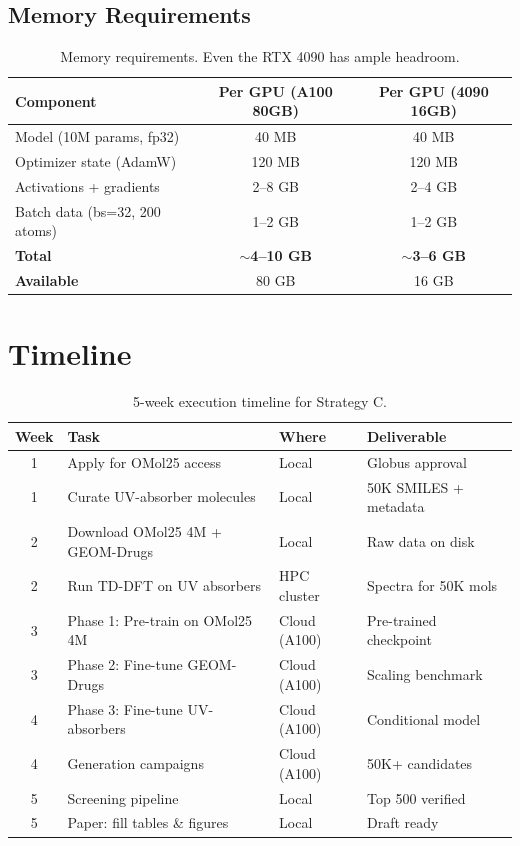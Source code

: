 \documentclass[11pt,a4paper]{article}
\begin{document}
\subsection{Memory Requirements}

\begin{table}[h]
\centering
\begin{tabular}{@{}lcc@{}}
\toprule
\textbf{Component} & \textbf{Per GPU (A100 80GB)} & \textbf{Per GPU (4090 16GB)} \\
\midrule
Model (10M params, fp32) & 40 MB & 40 MB \\
Optimizer state (AdamW) & 120 MB & 120 MB \\
Activations + gradients & 2--8 GB & 2--4 GB \\
Batch data (bs=32, 200 atoms) & 1--2 GB & 1--2 GB \\
\textbf{Total} & \textbf{$\sim$4--10 GB} & \textbf{$\sim$3--6 GB} \\
\textbf{Available} & 80 GB & 16 GB \\
\bottomrule
\end{tabular}
\caption{Memory requirements. Even the RTX 4090 has ample headroom.}
\end{table}

\section{Timeline}

\begin{table}[h]
\centering
\begin{tabular}{@{}clll@{}}
\toprule
\textbf{Week} & \textbf{Task} & \textbf{Where} & \textbf{Deliverable} \\
\midrule
1 & Apply for OMol25 access & Local & Globus approval \\
1 & Curate UV-absorber molecules & Local & 50K SMILES + metadata \\
2 & Download OMol25 4M + GEOM-Drugs & Local & Raw data on disk \\
2 & Run TD-DFT on UV absorbers & HPC cluster & Spectra for 50K mols \\
3 & Phase 1: Pre-train on OMol25 4M & Cloud (A100) & Pre-trained checkpoint \\
3 & Phase 2: Fine-tune GEOM-Drugs & Cloud (A100) & Scaling benchmark \\
4 & Phase 3: Fine-tune UV-absorbers & Cloud (A100) & Conditional model \\
4 & Generation campaigns & Cloud (A100) & 50K+ candidates \\
5 & Screening pipeline & Local & Top 500 verified \\
5 & Paper: fill tables \& figures & Local & Draft ready \\
\bottomrule
\end{tabular}
\caption{5-week execution timeline for Strategy C.}
\end{table}
\end{document}
